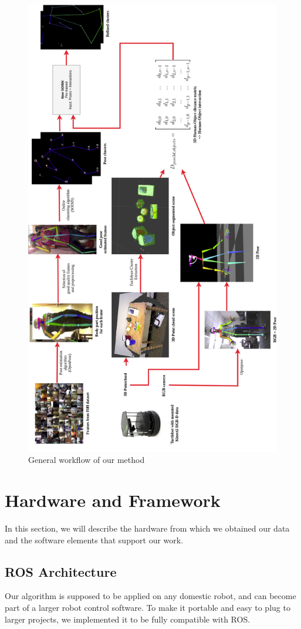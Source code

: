 \begin{figure}[htp]
\centering
\includegraphics[width=120mm, keepaspectratio]{images/workflow.png}
\caption{General workflow of our method}
\label{fig:workflow}
\end{figure}

\section{Hardware and Framework}
In this section, we will describe the hardware from which we obtained our data and the software elements that support our work.
\subsection{ROS Architecture}
Our algorithm is supposed to be applied on any domestic robot, and can become part of a larger robot control software. To make it portable and easy to plug to larger projects, we implemented it to be fully compatible with ROS.

